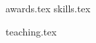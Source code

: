 \documentclass[letterpaper, 11pt]{article}
\begin{document}
  \vspace{-3mm}
  {awards.tex}
  \vspace{-3mm}
  {{skills.tex}}


  \vspace{-3mm}
  {teaching.tex}
  \vspace{-3mm}
\end{document}
